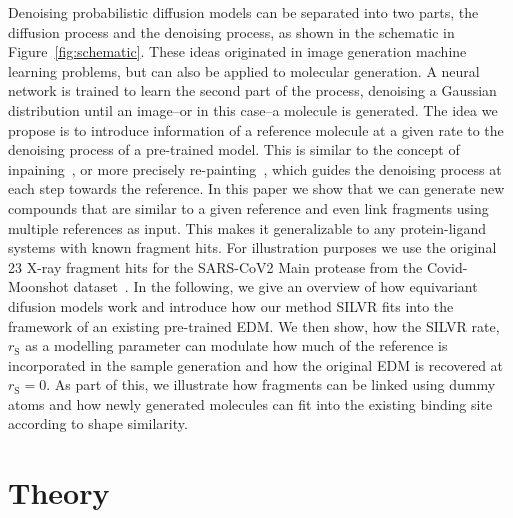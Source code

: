 \documentclass[journal=jacsat,manuscript=article]{achemso}
\begin{document}
Denoising probabilistic diffusion models can be separated into two parts, the diffusion process and the denoising process, as shown in the schematic in Figure~\ref{fig:schematic}. These ideas originated in image generation machine learning problems, but can also be applied to molecular generation. A neural network is trained to learn the second part of the process, denoising a Gaussian distribution until an image--or in this case--a molecule is generated. The idea we propose is to introduce information of a reference molecule at a given rate to the denoising process of a pre-trained model. This is similar to the concept of inpaining~\cite{qin2021image, xie2012image, squires2023artefact}, or more precisely re-painting~\cite{lugmayr2022repaint}, which guides the denoising process at each step towards the reference. In this paper we show that we can generate new compounds that are similar to a given reference and even link fragments using multiple references as input. This makes it generalizable to any protein-ligand systems with known fragment hits. For illustration purposes we use the original 23 X-ray fragment hits for the  SARS-CoV2 Main protease from the Covid-Moonshot dataset~\cite{consortium2021open,consortium2023open}. In the following, we give an overview of how equivariant difusion models work and introduce how our method SILVR fits into the framework of an existing pre-trained EDM. We then show, how the SILVR rate, $r_{\mathrm{S}}$ as a modelling parameter can modulate how much of the reference is incorporated in the sample generation and how the original EDM is recovered at  $r_{\mathrm{S}}=0$. As part of this, we illustrate how fragments can be linked using dummy atoms and how newly generated molecules can fit into the existing binding site according to shape similarity.

\section{Theory}
\label{sec:theory}
\end{document}
